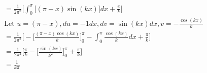 \documentclass{article}
\begin{document}
\begin{multicols}{2}
\begin{align*}
        &= \frac{1}{2\pi^2} \Bigg[ \int_{0}^{\pi}\Big[(\pi-x)\sin(kx)\Big]dx + \frac{\pi}{k} \Bigg] \\
        &\text{Let $u = (\pi-x), du = -1 dx, dv = \sin(kx) dx, v = -\frac{\cos(kx)}{k}$} \\
        &= \frac{1}{2\pi^2} \Bigg[- \Big[\frac{(\pi - x)\cos(kx)}{k}\Big]_{0}^{\pi} - \int_{0}^{\pi}\frac{\cos(kx)}{k}dx + \frac{\pi}{k} \Bigg] \\
        &= \frac{1}{2\pi^2} \Bigg[ \frac{\pi}{k} - \Big[\frac{\sin(kx)}{k^2}\Big]_{0}^{\pi}+ \frac{\pi}{k} \Bigg] \\
        &= \frac{1}{k\pi}
        \end{align*}
\end{multicols}
\end{document}
